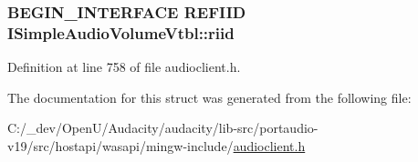 \subsubsection[{\texorpdfstring{riid}{riid}}]{\setlength{\rightskip}{0pt plus 5cm}B\+E\+G\+I\+N\+\_\+\+I\+N\+T\+E\+R\+F\+A\+CE {\bf R\+E\+F\+I\+ID} I\+Simple\+Audio\+Volume\+Vtbl\+::riid}\hypertarget{struct_i_simple_audio_volume_vtbl_a3ac3e9a09d98c902de6fe173aa868bc1}{}\label{struct_i_simple_audio_volume_vtbl_a3ac3e9a09d98c902de6fe173aa868bc1}


Definition at line 758 of file audioclient.\+h.



The documentation for this struct was generated from the following file\+:\begin{DoxyCompactItemize}
\item 
C\+:/\+\_\+dev/\+Open\+U/\+Audacity/audacity/lib-\/src/portaudio-\/v19/src/hostapi/wasapi/mingw-\/include/\hyperlink{audioclient_8h}{audioclient.\+h}\end{DoxyCompactItemize}
